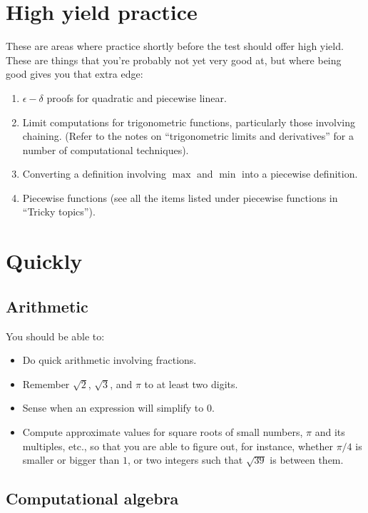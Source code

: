 \documentclass[10pt]{amsart}
\begin{document}
\section{High yield practice}

These are areas where practice shortly before the test should offer
high yield. These are things that you're probably not yet very good
at, but where being good gives you that extra edge:

\begin{enumerate}
\item $\epsilon-\delta$ proofs for quadratic and piecewise linear.
\item Limit computations for trigonometric functions, particularly
  those involving chaining. (Refer to the notes on ``trigonometric
  limits and derivatives'' for a number of computational techniques).
\item Converting a definition involving $\max$ and $\min$ into a
  piecewise definition.
\item Piecewise functions (see all the items listed under piecewise
  functions in ``Tricky topics'').
\end{enumerate}

\section{Quickly}

\subsection{Arithmetic}

You should be able to:

\begin{itemize}
\item Do quick arithmetic involving fractions.
\item Remember $\sqrt{2}$, $\sqrt{3}$, and $\pi$ to at least two
  digits.
\item Sense when an expression will simplify to $0$.
\item Compute approximate values for square roots of small numbers,
  $\pi$ and its multiples, etc., so that you are able to figure out,
  for instance, whether $\pi/4$ is smaller or bigger than $1$, or two
  integers such that $\sqrt{39}$ is between them.
\end{itemize}

\subsection{Computational algebra}
\end{document}
